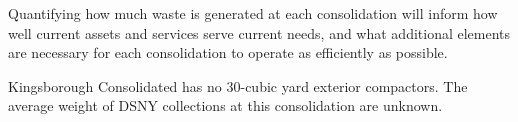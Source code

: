 
    Quantifying how much waste is generated at each consolidation will inform how well current assets and services serve current needs, and what additional elements are necessary for each consolidation to operate as efficiently as possible.
    
    Kingsborough Consolidated has no 30-cubic yard exterior compactors. The average weight of DSNY collections at this consolidation are unknown.